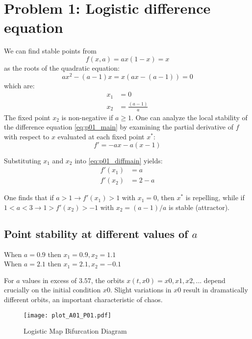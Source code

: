 \newcommand{\package}{\emph}

\setcounter{chapter}{1}
\setcounter{section}{0}
\section{Problem 1: Logistic difference equation}
We can find stable points from  
\begin{equation}
f(x, a) = ax(1-x) = x
\label{eq:p01_main}
\end{equation}
as the roots of the quadratic equation:
\begin{equation}
ax^2 - (a - 1)x = x(ax - (a - 1)) = 0
\end{equation}
which are:
\begin{align}
x_1 &= 0 \\
x_2 &= \frac{(a-1)}{a}
\end{align}
The fixed point $x_2$ is non-negative if $a \geq 1$.
One can analyze the local stability of the difference equation \ref{eq:p01_main} by examining the partial derivative of $f$ with respect to $x$ evaluated at each fixed point $x^{\ast}$:
\begin{equation}
f' = - ax - a(x - 1)
\label{eq:p01_diffmain}
\end{equation}

Substituting $x_1$ and $x_2$ into \ref{eq:p01_diffmain} yields:
\begin{align}
f'(x_1) &= a \\
f'(x_2) &= 2 - a
\end{align}

One finds that if $a>1 \rightarrow f'(x_1) > 1 $ with $x_1 = 0$, then $x^{\ast}$ is repelling, while if $1 < a < 3 \rightarrow 1 > f'(x_2) > -1 $ with $x_2 = (a - 1) / a$ is stable (attractor).

\subsection{Point stability at different values of $a$}

When $a = 0.9$ then $x_1 = 0.9, x_2 = 1.1$ \\
When $a = 2.1$ then $x_1 = 2.1, x_2 = -0.1$

For $a$ values in excess of $3.57$, the orbits $x(t, x0) = {x0, x1, x2, ... }$ depend crucially on the initial condition $x0$. Slight variations in $x0$ result in dramatically different orbits, an important characteristic of chaos.

\begin{figure}[h]
 \centering
    \texttt{[image: plot\_A01\_P01.pdf]}
    \caption{Logistic Map Bifurcation Diagram}
	\label{fig:plot_logistic_map_bifgraph}
\end{figure}


